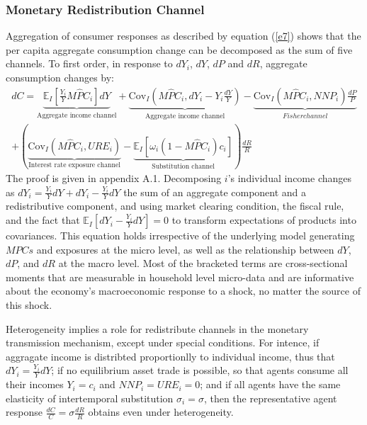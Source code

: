 \documentclass[11pt,letterpaper]{article}
\begin{document}
\subsubsection{Monetary Redistribution Channel}
Aggregation of consumer responses as described by equation (\ref{e7}) shows that the per capita aggregate consumption change can be decomposed as the sum of five channels. To first order, in response to $dY_{i}$, $dY$, $dP$ and $dR$, aggregate consumption changes by: 
\begin{equation}\begin{split}\label{e10}
		dC = \underbrace{\mathbb{E}_{I} \left[\frac{Y_{i}}{Y} M\widehat{P}C_{i}\right] dY}_{\text{Aggregate income channel}} + \underbrace{\mathrm{Cov}_{I} \left(M\widehat{P}C_{i}, dY_{i} - Y_{i} \frac{dY}{Y}\right)}_{\text{Aggregate income channel}} - \underbrace{\mathrm{Cov}_{I} (M\widehat{P}C_{i}, NNP_{i}) \frac{dP}{P}}_{Fisher channel} \\
		+ \left( \underbrace{\mathrm{Cov}_{I} (M\widehat{P}C_{i}, URE_{i})}_{\text{Interest rate exposure channel}} - \underbrace{\mathbb{E}_{I} \left[ \omega_{i} (1 - M\widehat{P}C_{i})c_{i}\right]}_{\text{Substitution channel}}\right) \frac{dR}{R}
\end{split}\end{equation}
The proof is given in appendix A.1. Decomposing $i$'s individual income changes as $dY_{i} = \frac{Y_{i}}{Y}dY + dY_{i} - \frac{Y_{i}}{Y}dY$ the sum of an aggregate component and a redistributive component, and using market clearing condition, the fiscal rule, and the fact that $\mathbb{E}_{I}\left[dY_{i} - \frac{Y_{i}}{Y} dY\right] = 0$ to transform expectations of products into covariances. This equation holds irrespective of the underlying model generating $MPCs$ and exposures at the micro level, as well as the relationship between $dY$, $dP$, and $dR$ at the macro level. Most of the bracketed terms are cross-sectional moments that are measurable in household level micro-data and are informative about the economy's macroeconomic response to a shock, no matter the source of this shock. 

Heterogeneity implies a role for redistribute channels in the monetary transmission mechanism, except under special conditions. For intence, if aggragate income is distribted proportionlly to individual income, thus that $dY_{i} = \frac{Y_{i}}{Y}dY$; if no equilibrium asset trade is possible, so that agents consume all their incomes $Y_{i} = c_{i}$ and $NNP_{i} = URE_{i} = 0$; and if all agents have the same elasticity of intertemporal substitution $\sigma_{i} = \sigma$, then the representative agent response $\frac{dC}{C} = \sigma\frac{dR}{R}$ obtains even under heterogeneity. 
\end{document}
